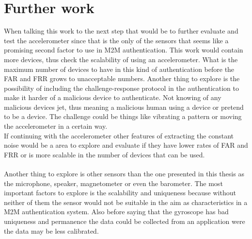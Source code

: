 \section{Further work}
When talking this work to the next step that would be to further evaluate and test the accelerometer since that is the only of the sensors that seems like a promising second factor to use in M2M authentication. This work would contain more devices, thus check the scalability of using an accelerometer. What is the maximum number of devices to have in this kind of authentication before the FAR and FRR grows to unacceptable numbers. Another thing to explore is the possibility of including the challenge-response protocol in the authentication to make it harder of a malicious device to authenticate. Not knowing of any malicious devices jet, thus meaning a malicious human using a device or pretend to be a device. The challenge could be things like vibrating a pattern or moving the accelerometer in a certain way.\\
If continuing with the accelerometer other features of extracting the constant noise would be a area to explore and evaluate if they have lower rates of FAR and FRR or is more scalable in the number of devices that can be used. \\
\\
Another thing to explore is other sensors than the one presented in this thesis as the microphone, speaker, magnetometer or even the barometer. The most important factors to explore is the scalability and uniqueness because without neither of them the sensor would not be suitable in the aim as characteristics in a M2M authentication system. Also before saying that the gyroscope has bad uniqueness and permanence the data could be collected from an application were the data may be less calibrated.